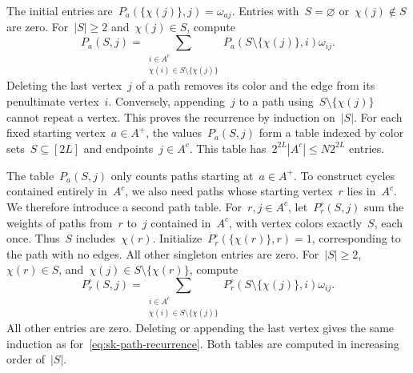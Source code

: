 \documentclass[letterpaper,11pt,reqno]{amsart}
\renewcommand{\leq}{\leqslant}
\renewcommand{\geq}{\geqslant}
\begin{document}
The initial entries are~$P_a(\{\chi(j)\},j)=\omega_{aj}$. Entries with~$S=\varnothing$ or~$\chi(j)\notin S$ are zero. For~$|S|\geq2$ and~$\chi(j)\in S$, compute
\begin{equation}\label{eq:sk-path-recurrence}
P_a(S,j)=\sum_{\substack{i\in A^c\\\chi(i)\in S\setminus\{\chi(j)\}}}
P_a(S\setminus\{\chi(j)\},i)\omega_{ij}.
\end{equation}
Deleting the last vertex~$j$ of a path removes its color and the edge from its penultimate vertex~$i$. Conversely, appending~$j$ to a path using~$S\setminus\{\chi(j)\}$ cannot repeat a vertex. This proves the recurrence by induction on~$|S|$. For each fixed starting vertex~$a\in A^+$, the values~$P_a(S,j)$ form a table indexed by color sets~$S\subseteq[2L]$ and endpoints~$j\in A^c$. This table has~$2^{2L}|A^c|\leq N2^{2L}$ entries.

The table~$P_a(S,j)$ only counts paths starting at~$a\in A^+$. To construct cycles contained entirely in~$A^c$, we also need paths whose starting vertex~$r$ lies in~$A^c$. We therefore introduce a second path table. For~$r,j\in A^c$, let~$P_r^\circ(S,j)$ sum the weights of paths from~$r$ to~$j$ contained in~$A^c$, with vertex colors exactly~$S$, each once. Thus~$S$ includes~$\chi(r)$. Initialize~$P_r^\circ(\{\chi(r)\},r)=1$, corresponding to the path with no edges. All other singleton entries are zero. For~$|S|\geq2$, $\chi(r)\in S$, and~$\chi(j)\in S\setminus\{\chi(r)\}$, compute
\begin{equation}\label{eq:sk-cycle-recurrence}
P_r^\circ(S,j)=\sum_{\substack{i\in A^c\\\chi(i)\in S\setminus\{\chi(j)\}}}
P_r^\circ(S\setminus\{\chi(j)\},i)\omega_{ij}.
\end{equation}
All other entries are zero. Deleting or appending the last vertex gives the same induction as for~\eqref{eq:sk-path-recurrence}. Both tables are computed in increasing order of~$|S|$.
\end{document}
